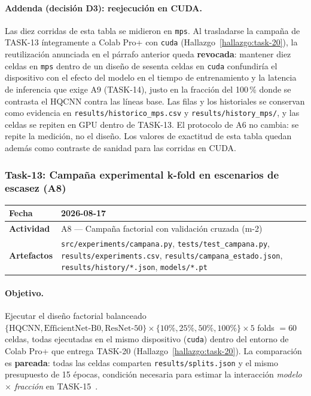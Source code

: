 \paragraph{Addenda (decisión D3): reejecución en CUDA.}
Las diez corridas de esta tabla se midieron en \texttt{mps}. Al trasladarse la campaña de
TASK-13 íntegramente a Colab Pro+ con \texttt{cuda} (Hallazgo~\ref{hallazgo:task-20}), la
reutilización anunciada en el párrafo anterior queda \textbf{revocada}: mantener diez celdas
en \texttt{mps} dentro de un diseño de sesenta celdas en \texttt{cuda} confundiría el
dispositivo con el efecto del modelo en el tiempo de entrenamiento y la latencia de
inferencia que exige A9 (TASK-14), justo en la fracción del 100\,\% donde se contrasta el
HQCNN contra las líneas base. Las filas y los historiales se conservan como evidencia en
\texttt{results/historico\_mps.csv} y \texttt{results/history\_mps/}, y las celdas se repiten
en GPU dentro de TASK-13. El protocolo de A6 no cambia: se repite la medición, no el diseño.
Los valores de exactitud de esta tabla quedan además como contraste de sanidad para las
corridas en CUDA.

\subsubsection{Task-13: Campaña experimental k-fold en escenarios de escasez (A8)}
\label{hallazgo:task-13}
\begin{tabularx}{\textwidth}{|l|X|}\hline
\textbf{Fecha} & 2026-08-17 \\\hline
\textbf{Actividad} & A8 --- Campaña factorial con validación cruzada (m-2) \\\hline
\textbf{Artefactos} & \texttt{src/experiments/campana.py}, \texttt{tests/test\_campana.py}, \texttt{results/experiments.csv}, \texttt{results/campana\_estado.json}, \texttt{results/history/*.json}, \texttt{models/*.pt} \\\hline
\end{tabularx}

\paragraph{Objetivo.}
Ejecutar el diseño factorial balanceado
$\{\text{HQCNN}, \text{EfficientNet-B0}, \text{ResNet-50}\} \times \{10\%, 25\%, 50\%, 100\%\} \times 5$ folds
$= 60$ celdas, todas ejecutadas en el mismo dispositivo (\texttt{cuda}) dentro del entorno de
Colab Pro+ que entrega TASK-20 (Hallazgo~\ref{hallazgo:task-20}).
La comparación es \textbf{pareada}: todas las celdas comparten \texttt{results/splits.json}
y el mismo presupuesto de 15 épocas, condición necesaria para estimar la interacción
\textit{modelo $\times$ fracción} en TASK-15~\cite{caro2022generalization,gupta2025systematic}.

